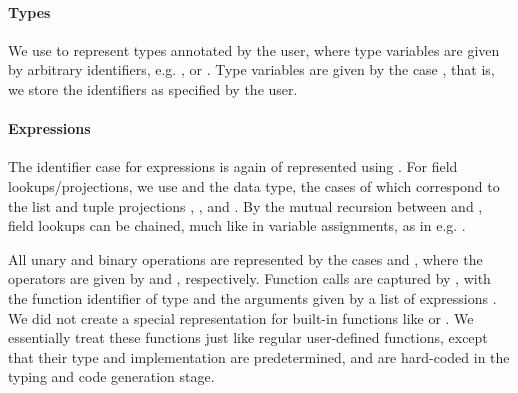 \paragraph{Types}
We use  to represent types annotated by the user, where type
variables are given by arbitrary identifiers, e.g. , or
. Type variables are given by the case
, that is, we store the identifiers as specified by
the user.


\paragraph{Expressions}
The identifier case for expressions is again of represented using
. For field lookups/projections, we use 
and the  data type, the cases of which correspond to the list and
tuple projections , ,  and .
By the mutual recursion between  and , field
lookups can be chained, much like in variable assignments, as in e.g.
.

All unary and binary operations are represented by the cases  and
, where the operators are given by  and
, respectively.
Function calls are captured by , with the function identifier
of type  and the arguments given by a list of expressions
\haskell{[Expr]}.
We did not create a special representation for built-in functions like
 or . We essentially treat these functions just like
regular user-defined functions, except that their type and implementation are
predetermined, and are hard-coded in the typing and code generation stage.


